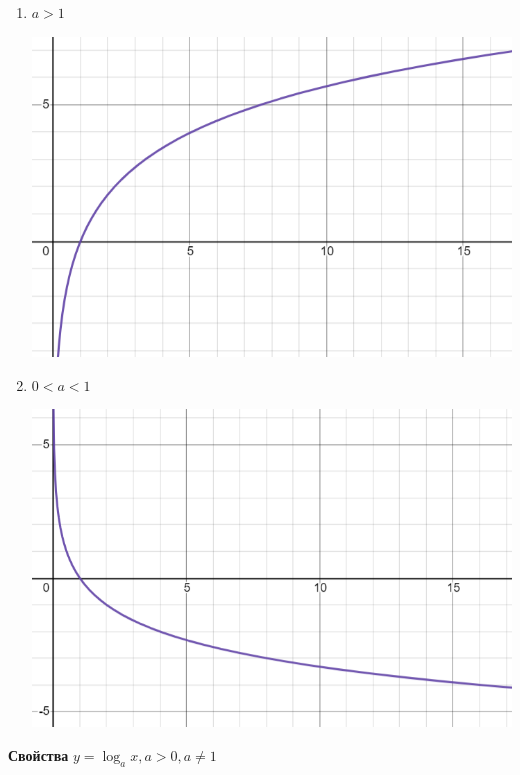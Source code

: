 \documentclass{article}
\begin{document}
    \begin{enumerate}
        \item \(a > 1\)
        
        \includegraphics[scale=0.45]{11_1_7_1.png}
        \item \(0 < a < 1\)
        
        \includegraphics[scale=0.45]{11_1_7_2.png}
    \end{enumerate}

    \textbf{Свойства} \(y = \log_a x, a > 0, a \neq 1\)
\end{document}
